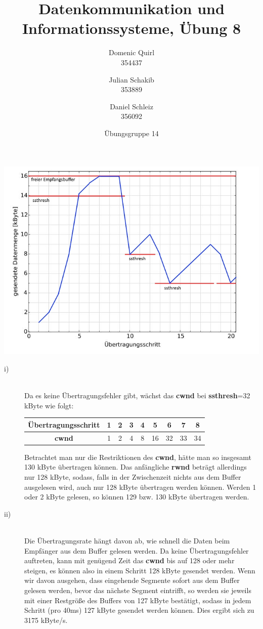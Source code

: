 \documentclass{../exercisesheet}
\title{Datenkommunikation und Informationssysteme, Übung 8}
\author{
    Domenic Quirl \\ 354437
    \and
    Julian Schakib \\ 353889
    \and 
    Daniel Schleiz \\ 356092
}
\date{Übungsgruppe 14}
\begin{document}
\maketitle
\pointtable


\begin{exercise}{6}
\begin{subexercise}
\begin{center}
\includegraphics[scale=0.8]{1a.jpg}
\end{center}
\end{subexercise}
\begin{subexercise}
\begin{description}
\item[i)] \ \\
Da es keine Übertragungsfehler gibt, wächst das \textbf{cwnd} bei \textbf{ssthresh}=32 kByte wie folgt:
\begin{center}
\begin{tabular}{c||*{7}{c|}c}
Übertragungsschritt & 1 & 2 & 3 & 4 & 5 & 6 & 7 & 8\\
\hline
\textbf{cwnd} & 1 & 2 & 4 & 8 & 16 & 32 & 33 & 34\\
\end{tabular}
\end{center}
Betrachtet man nur die Restriktionen des \textbf{cwnd}, hätte man so insgesamt 130 kByte übertragen können. Das anfängliche \textbf{rwnd} beträgt allerdings nur 128 kByte, sodass, falls in der Zwischenzeit nichts aus dem Buffer ausgelesen wird, auch nur 128 kByte übertragen werden können. Werden 1 oder 2 kByte gelesen, so können 129 bzw. 130 kByte übertragen werden.
\item[ii)] \ \\
Die Übertragungsrate hängt davon ab, wie schnell die Daten beim Empfänger aus dem Buffer gelesen werden. Da keine Übertragungsfehler auftreten, kann mit genügend Zeit das \textbf{cwnd} bis auf 128 oder mehr steigen, es können also in einem Schritt 128 kByte gesendet werden. Wenn wir davon ausgehen, dass eingehende Segmente sofort aus dem Buffer gelesen werden, bevor das nächste Segment eintrifft, so werden sie jeweils mit einer Restgröße des Buffers von 127 kByte bestätigt, sodass in jedem Schritt (pro 40ms) 127 kByte gesendet werden können. Dies ergibt sich zu 3175 kByte/s.


\end{description}
\end{subexercise}
\end{exercise}
\end{document}
